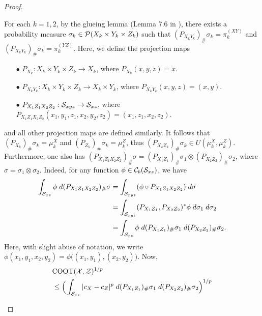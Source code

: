 \begin{proof}
\begin{enumerate}
      For each $k = 1,2$, by the glueing lemma (Lemma 7.6 in \citep{Villani03}), there exists a probability measure
      $\sigma_k \in \mathcal P(X_k \times Y_k \times Z_k)$ such that
      $(P_{X_k Y_k})_{\#} \sigma_k = \pi^{(XY)}_k$ and
      $(P_{X_k Y_k})_{\#} \sigma_k = \pi^{(YZ)}_k$. Here, we define the projection maps
      \begin{itemize}
        \item[$\bullet$] $P_{X_k}: X_k \times Y_k \times Z_k \to X_k$, where
        $P_{X_k}(x,y,z) = x$.
        \item[$\bullet$] $P_{X_k Y_k}: X_k \times Y_k \times Z_k \to X_k \times Y_k$,
        where $P_{X_k Y_k}(x,y,z) = (x,y)$.
        \item[$\bullet$] $P_{X_1 Z_1 X_2 Z_2}: \mathcal S_{xyz} \to \mathcal S_{xz}$, where
        $P_{X_1 Z_1 X_2 Z_2}(x_1,y_1,z_1, x_2, y_2, z_2) = (x_1,z_1, x_2, z_2)$.
      \end{itemize}
      and all other projection maps are defined similarly. It follows that
      $(P_{X_k})_{\#} \sigma_k = \mu_k^X$ and $(P_{Z_k})_{\#} \sigma_k = \mu_k^Z$, thus
      $(P_{X_k Z_k})_{\#} \sigma_k \in U(\mu_k^X, \mu_k^Z)$. Furthermore, one also has
      $(P_{X_1 Z_1 X_2 Z_2})_{\#} \sigma =
      (P_{X_1 Z_1})_{\#} \sigma_1 \otimes (P_{X_2 Z_2})_{\#} \sigma_2$,
      where $\sigma = \sigma_1 \otimes \sigma_2$. Indeed, for any function $\phi \in \mathcal C_b(\mathcal S_{xz})$, we have
      \begin{equation}
        \begin{split}
          \int_{\mathcal S_{xz}} \phi \; d(P_{X_1 Z_1 X_2 Z_2})_{\#} \sigma
          &= \int_{\mathcal S_{xyz}} (\phi \circ P_{X_1 Z_1 X_2 Z_2}) \; d\sigma \\
          &= \int_{\mathcal S_{xyz}} (P_{X_1 Z_1}, P_{X_2 Z_2})^*\phi
          \; d \sigma_1 \; d \sigma_2 \\
          &= \int_{\mathcal S_{xz}} \phi \; d (P_{X_1 Z_1})_{\#} \sigma_1 \;
          d (P_{X_2 Z_2})_{\#} \sigma_2.
        \end{split}
      \end{equation}
      Here, with slight abuse of notation, we write $\phi(x_1,y_1, x_2,y_2) = \phi\big( (x_1,y_1), (x_2,y_2) \big)$. Now,
      \begin{equation}
        \begin{split}
          &\coot(\cX, \cZ)^{1/p} \\
          &\leq \Big( \int_{\cS_{xz}} \vert c_X - c_Z \vert^p
          \; d (P_{X_1 Z_1})_{\#} \sigma_1 \; d (P_{X_2 Z_2})_{\#} \sigma_2 \Big)^{1/p} \\

\end{split}
\end{equation}
\end{enumerate}
\end{proof}
